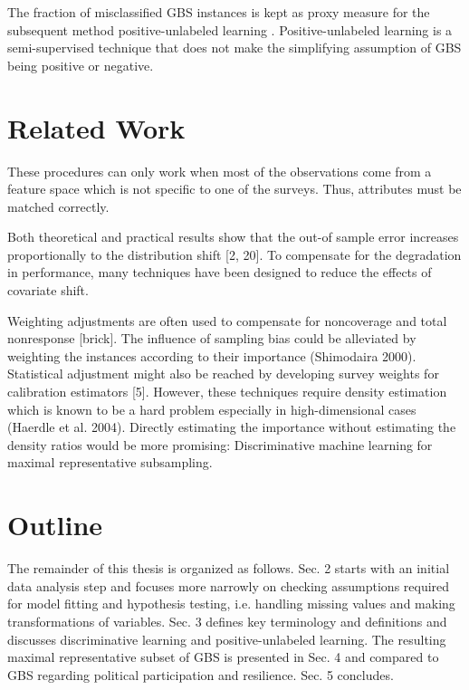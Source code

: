 The fraction of misclassified GBS instances is kept as proxy measure for the subsequent method positive-unlabeled learning \cite{denis, claesen}. Positive-unlabeled learning is a semi-supervised technique that does not make the simplifying assumption of GBS being positive or negative.

\section{Related Work}

These procedures can only work when most of the observations come from a feature space which is not specific to one of the surveys. Thus, attributes must be matched correctly. 

Both theoretical and practical results show that the out-of sample error increases proportionally to the distribution shift [2, 20]. To compensate for the degradation in performance, many techniques have been designed to reduce the effects of covariate shift.

Weighting adjustments are often used to compensate for noncoverage and total nonresponse [brick]. The influence of sampling bias could be alleviated by weighting the instances according to their importance (Shimodaira 2000). Statistical adjustment might also be reached by developing survey weights for calibration estimators [5]. However, these techniques require density estimation which is known to be a hard problem especially in high-dimensional cases (Haerdle et al. 2004). Directly estimating the importance without estimating the density ratios would be more promising: Discriminative machine learning for maximal representative subsampling.

\section{Outline}

The remainder of this thesis is organized as follows. Sec. 2 starts with an initial data analysis step and focuses more narrowly on checking assumptions required for model fitting and hypothesis testing, i.e. handling missing values and making transformations of variables. Sec. 3 defines key terminology and definitions and discusses discriminative learning and positive-unlabeled learning. The resulting maximal representative subset of GBS is presented in Sec. 4 and compared to GBS regarding political participation and resilience. Sec. 5 concludes.
